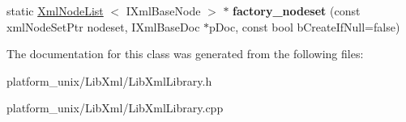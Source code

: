 \begin{DoxyCompactItemize}
\item 
\hypertarget{classgeneral__server_1_1LibXmlLibrary_a552883c67005eaa3e078aa97287b86a0}{static \hyperlink{classgeneral__server_1_1XmlNodeList}{\-Xml\-Node\-List}\*
$<$ \-I\-Xml\-Base\-Node $>$ $\ast$ {\bfseries factory\-\_\-nodeset} (const xml\-Node\-Set\-Ptr nodeset, \-I\-Xml\-Base\-Doc $\ast$p\-Doc, const bool b\-Create\-If\-Null=false)}\label{classgeneral__server_1_1LibXmlLibrary_a552883c67005eaa3e078aa97287b86a0}

\end{DoxyCompactItemize}


\-The documentation for this class was generated from the following files\-:\begin{DoxyCompactItemize}
\item 
platform\-\_\-unix/\-Lib\-Xml/\-Lib\-Xml\-Library.\-h\item 
platform\-\_\-unix/\-Lib\-Xml/\-Lib\-Xml\-Library.\-cpp\end{DoxyCompactItemize}
